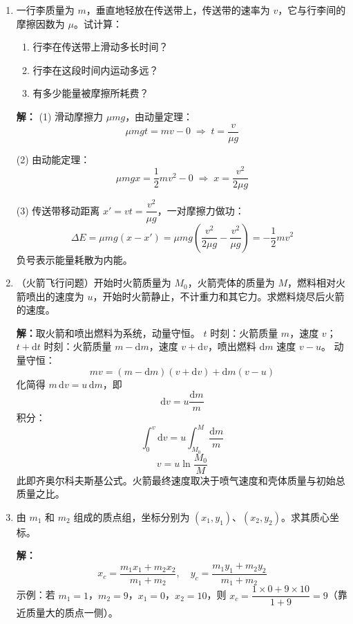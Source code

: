 \documentclass{ctexart}
\begin{document}
\begin{enumerate}
\textbf{解：}水平方向合外力为零，动量守恒：
\[
mv_x - MV = 0
\]
系统机械能守恒，选水平面为重力势能零点：
\[
mgH = mgh + \frac12 MV^{2} + \frac12 m(v_x^{2} + v_y^{2})
\]
其中 $v_x = v_r\cos\theta - V$，$v_y = -v_r\sin\theta$。
解得：
\[
V = m\sqrt{\frac{2g(H-h)\cos^{2}\theta}{(M+m)(M+m\sin^{2}\theta)}},\quad
v_r = \sqrt{\frac{2g(H-h)(M+m)}{M+m\sin^{2}\theta}}
\]

\item 一行李质量为 $m$，垂直地轻放在传送带上，传送带的速率为 $v$，它与行李间的摩擦因数为 $\mu$。试计算：
\begin{enumerate}
  \item 行李在传送带上滑动多长时间？
  \item 行李在这段时间内运动多远？
  \item 有多少能量被摩擦所耗费？
\end{enumerate}

\textbf{解：}
(1) 滑动摩擦力 $\mu mg$，由动量定理：
\[
\mu mg t = mv - 0 \;\Longrightarrow\; t = \frac{v}{\mu g}
\]

(2) 由动能定理：
\[
\mu mg x = \frac12 mv^{2} - 0 \;\Longrightarrow\; x = \frac{v^{2}}{2\mu g}
\]

(3) 传送带移动距离 $x' = vt = \dfrac{v^{2}}{\mu g}$，一对摩擦力做功：
\[
\Delta E = \mu mg(x - x') = \mu mg\left(\frac{v^{2}}{2\mu g} - \frac{v^{2}}{\mu g}\right) = -\frac12 mv^{2}
\]
负号表示能量耗散为内能。

\item（火箭飞行问题）开始时火箭质量为 $M_0$，火箭壳体的质量为 $M$，燃料相对火箭喷出的速度为 $u$，开始时火箭静止，不计重力和其它力。求燃料烧尽后火箭的速度。

\textbf{解：}取火箭和喷出燃料为系统，动量守恒。
$t$ 时刻：火箭质量 $m$，速度 $v$；$t+\mathrm{d}t$ 时刻：火箭质量 $m-\mathrm{d}m$，速度 $v+\mathrm{d}v$，喷出燃料 $\mathrm{d}m$ 速度 $v-u$。
动量守恒：
\[
mv = (m-\mathrm{d}m)(v+\mathrm{d}v) + \mathrm{d}m(v-u)
\]
化简得 $m\,\mathrm{d}v = u\,\mathrm{d}m$，即
\[
\mathrm{d}v = u\frac{\mathrm{d}m}{m}
\]
积分：
\[
\int_0^v \mathrm{d}v = u\int_{M_0}^{M} \frac{\mathrm{d}m}{m}
\]
\[
v = u\ln\frac{M_0}{M}
\]
此即齐奥尔科夫斯基公式。火箭最终速度取决于喷气速度和壳体质量与初始总质量之比。

\item 由 $m_1$ 和 $m_2$ 组成的质点组，坐标分别为 $(x_1, y_1)$、$(x_2, y_2)$。求其质心坐标。

\textbf{解：}
\[
x_c = \frac{m_1 x_1 + m_2 x_2}{m_1 + m_2},\quad
y_c = \frac{m_1 y_1 + m_2 y_2}{m_1 + m_2}
\]
示例：若 $m_1 = 1$，$m_2 = 9$，$x_1 = 0$，$x_2 = 10$，则 $x_c = \dfrac{1\times0 + 9\times10}{1+9} = 9$（靠近质量大的质点一侧）。


\end{enumerate}
\end{document}
